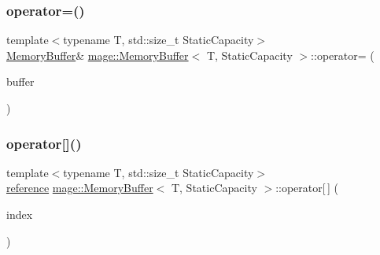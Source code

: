 \mbox{\label{classmage_1_1_memory_buffer_a4fc4b25064d527e7075b2113673a27d1}} 
\subsubsection{\texorpdfstring{operator=()}{operator=()}\hspace{0.1cm}{\footnotesize\ttfamily [2/2]}}
{\footnotesize\ttfamily template$<$typename T, std\+::size\+\_\+t Static\+Capacity$>$ \\
\mbox{\hyperlink{classmage_1_1_memory_buffer}{Memory\+Buffer}}\& \mbox{\hyperlink{classmage_1_1_memory_buffer}{mage\+::\+Memory\+Buffer}}$<$ T, Static\+Capacity $>$\+::operator= (\begin{DoxyParamCaption}\item[{\mbox{\hyperlink{classmage_1_1_memory_buffer}{Memory\+Buffer}}$<$ T, Static\+Capacity $>$ \&\&}]{buffer }\end{DoxyParamCaption})\hspace{0.3cm}{\ttfamily [delete]}}

\mbox{\label{classmage_1_1_memory_buffer_a71dc88ccb1b189a772ef4c5d095b883e}} 
\subsubsection{\texorpdfstring{operator[]()}{operator[]()}\hspace{0.1cm}{\footnotesize\ttfamily [1/2]}}
{\footnotesize\ttfamily template$<$typename T, std\+::size\+\_\+t Static\+Capacity$>$ \\
\mbox{\hyperlink{classmage_1_1_memory_buffer_ad28560f5391baac5dade220c99d9d62b}{reference}} \mbox{\hyperlink{classmage_1_1_memory_buffer}{mage\+::\+Memory\+Buffer}}$<$ T, Static\+Capacity $>$\+::operator\mbox{[}$\,$\mbox{]} (\begin{DoxyParamCaption}\item[{\mbox{\hyperlink{classmage_1_1_memory_buffer_a77b459da2e6f1c57c21467a6eff8e9f9}{size\+\_\+type}}}]{index }\end{DoxyParamCaption})\hspace{0.3cm}{\ttfamily [noexcept]}}

